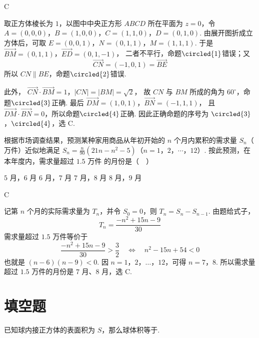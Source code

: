 \begin{answer}
C
\end{answer}

\begin{solution}
取正方体棱长为 \(1\)，以图中中央正方形 \(ABCD\) 所在平面为 \(z=0\)，令
\(A=(0,0,0)\)，\(B=(1,0,0)\)，\(C=(1,1,0)\)，\(D=(0,1,0)\).
由展开图折成立方体后，可取 \(E=(0,0,1)\)，\(N=(0,1,1)\)，\(M=(1,1,1)\). 于是
\(\overrightarrow{BM}=(0,1,1)\)，\(\overrightarrow{ED}=(0,1,-1)\)，
二者不平行，命题\(\circled{1}\)错误；又
\[
\overrightarrow{CN}=(-1,0,1)=\overrightarrow{BE}
\]
所以 \(CN\parallel BE\)，命题\(\circled{2}\)错误.

此外，
\(\overrightarrow{CN}\cdot\overrightarrow{BM}=1\)，\(|CN|=|BM|=\sqrt2\)，
故 \(CN\) 与 \(BM\) 所成的角为 \(60^\circ\)，命题\(\circled{3}\)正确. 最后
\(\overrightarrow{DM}=(1,0,1)\)，\(\overrightarrow{BN}=(-1,1,1)\)，
且 \(\overrightarrow{DM}\cdot\overrightarrow{BN}=0\)，所以命题\(\circled{4}\)正确. 因此正确命题的序号为 \(\circled{3}\)，\(\circled{4}\)，选 C.
\end{solution}

\begin{problem}
根据市场调查结果，预测某种家用商品从年初开始的 \(n\) 个月内累积的需求量 \(S_{n}\)（\(\text{万件}\)）近似地满足 \(S_{n} = \frac{n}{90}(21n - n^{2} - 5)\)（\(n = 1\)，\(2\)，\(\cdots\)，\(12\)）. 按此预测，在本年度内，需求量超过 \(1.5\text{ 万件}\) 的月份是（\(\quad\)）

\choices
    {\(5\text{ 月}\)，\(6\text{ 月}\)}
    {\(6\text{ 月}\)，\(7\text{ 月}\)}
    {\(7\text{ 月}\)，\(8\text{ 月}\)}
    {\(8\text{ 月}\)，\(9\text{ 月}\)}
\end{problem}

\begin{answer}
C
\end{answer}

\begin{solution}
记第 \(n\) 个月的实际需求量为 \(T_n\)，并令 \(S_0=0\)，则 \(T_n=S_n-S_{n-1}\). 由题给式子，
\[
T_n=\frac{-n^2+15n-9}{30}
\]
需求量超过 \(1.5\) 万件等价于
\[
\frac{-n^2+15n-9}{30}>\frac32\quad\Longleftrightarrow\quad n^2-15n+54<0
\]
也就是 \((n-6)(n-9)<0\). 因 \(n=1\)，\(2\)，\(\ldots\)，\(12\)，可得 \(n=7\)，\(8\). 所以需求量超过 \(1.5\) 万件的月份是 \(7\) 月、\(8\) 月，选 C.
\end{solution}

\section{填空题}
\begin{problem}
已知球内接正方体的表面积为 \(S\)，那么球体积等于\fillinblank{}.
\end{problem}

